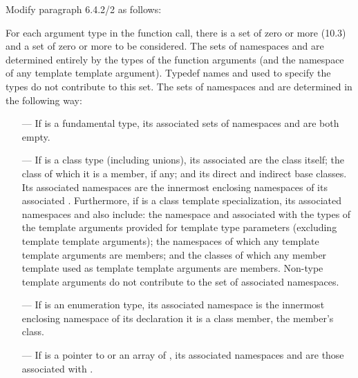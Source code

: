 \noindent
Modify paragraph 6.4.2/2 as follows:
\begin{std.txt}
  \resetalinea[1]
  \alinea
  For each argument type  in the function call, there is a
  set of zero or more  (10.3) and a set of
  zero or more 
   to be considered.  The sets of
  namespaces and   are determined
  entirely by the types of the function arguments (and the namespace
  of any template template argument).  Typedef names and
   used to specify the types do not
  contribute to this set.  The sets of namespaces
  and   are determined in the
  following way:
  \begin{itemize}
  \item[---] If  is a fundamental type, its associated sets
  of namespaces and   are both empty.

  \item[---] If  is a class type (including unions), its
  associated   are the class itself;
  the class of which it is a member, if any; and its direct and
  indirect base classes.  Its associated namespaces are the innermost
  enclosing namespaces of its associated  .
  Furthermore, if  is a class template specialization, its
  associated namespaces and   also
  include: the namespace and  
  associated with the types of the template arguments provided for
  template type parameters (excluding template template arguments);
   the
  namespaces of which any template template arguments are members;
  and the classes of which any member template used as template
  template arguments are members. \enternote Non-type template
  arguments do not contribute to the set of associated namespaces. \exitnote

  \item[---] If  is an enumeration type, its associated
  namespace is the innermost enclosing namespace of its
  declaration it is a class member,  the member's class.

  \item[---] If  is a pointer to  or an array
  of , its associated namespaces
  and   are those associated
  with . 


\end{itemize}
\end{std.txt}
